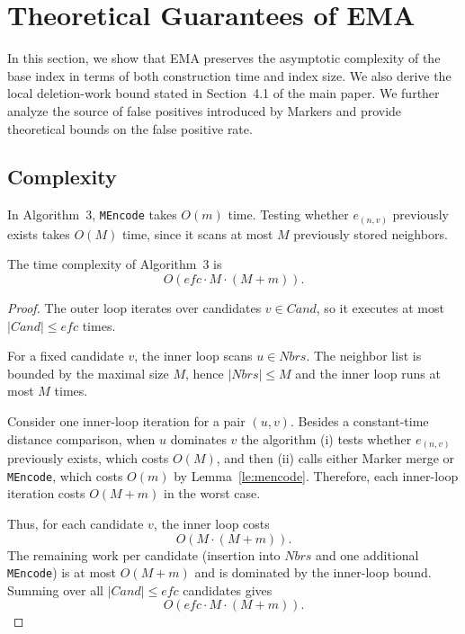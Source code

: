 \section{Theoretical Guarantees of EMA}

In this section, we show that EMA preserves the asymptotic complexity of the base index in terms of both construction time and index size.
We also derive the local deletion-work bound stated in Section~4.1 of the main paper.
We further analyze the source of false positives introduced by Markers and provide theoretical bounds on the false positive rate.



\subsection{Complexity}



\begin{lemma}
In Algorithm~3, \texttt{MEncode} takes
$O(m)$ time. Testing whether $e_{(n,v)}$ previously exists takes $O(M)$ time,
since it scans at most $M$ previously stored neighbors.
\label{le:mencode}
\end{lemma}

\begin{theorem}
The time complexity of Algorithm~3 is
\[
O\!\left(efc \cdot M \cdot (M+m)\right).
\]
\end{theorem}

\begin{proof}
The outer loop iterates over candidates $v\in Cand$, so it executes at most
$|Cand|\le efc$ times.

For a fixed candidate $v$, the inner loop scans $u\in Nbrs$. The neighbor list is
bounded by the maximal size $M$, hence $|Nbrs|\le M$ and the inner loop runs at most
$M$ times.

Consider one inner-loop iteration for a pair $(u,v)$. Besides a constant-time distance
comparison, when $u$ dominates $v$ the algorithm (i) tests whether $e_{(n,v)}$ previously exists,
which costs $O(M)$, and then (ii) calls either Marker merge or \texttt{MEncode},
which costs $O(m)$ by Lemma~\ref{le:mencode}. Therefore, each inner-loop iteration costs $O(M+m)$ in the worst case.

Thus, for each candidate $v$, the inner loop costs
\[
O\!\left(M\cdot(M+m)\right).
\]
The remaining work per candidate (insertion into $Nbrs$ and one additional
\texttt{MEncode}) is at most $O(M+m)$ and is dominated by the inner-loop bound.
Summing over all $|Cand|\le efc$ candidates gives
\[
O\!\left(efc \cdot M \cdot (M+m)\right).
\]
\end{proof}



